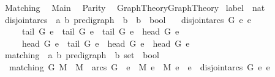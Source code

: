 %
\begin{isabellebody}%
\def\isabellecontext{Matching}%
%
\isadelimtheory
%
\endisadelimtheory
%
\isatagtheory
{}\isamarkupfalse%
\ Matching\isanewline
{}\isanewline
\ \ Main\isanewline
\ \ Parity\isanewline
\ \ {\isachardoublequoteopen}{\isachardot}{\isachardot}{\isacharslash}Graph{\isacharunderscore}Theory{\isacharslash}Graph{\isacharunderscore}Theory{\isachardoublequoteclose}\isanewline
{}%
\endisatagtheory
{\isafoldtheory}%
%
\isadelimtheory
\isanewline
%
\endisadelimtheory
\isanewline
\isanewline
{}\isamarkupfalse%
\ label\ {\isacharequal}\ nat\isanewline
\isanewline
{}\isamarkupfalse%
\ disjoint{\isacharunderscore}arcs\ {\isacharcolon}{\isacharcolon}\ {\isachardoublequoteopen}{\isacharparenleft}{\isacharprime}a{\isacharcomma}\ {\isacharprime}b{\isacharparenright}\ pre{\isacharunderscore}digraph\ {\isacharequal}{\isachargreater}\ {\isacharprime}b\ {\isasymRightarrow}\ {\isacharprime}b\ {\isasymRightarrow}\ bool{\isachardoublequoteclose}\ \isanewline
\ \ {\isachardoublequoteopen}disjoint{\isacharunderscore}arcs\ G\ e{}\ e{}\ {\isacharequal}\ {\isacharparenleft}\isanewline
\ \ \ \ \ tail\ G\ e{}\ {\isasymnoteq}\ tail\ G\ e{}\ {\isasymand}\ tail\ G\ e{}\ {\isasymnoteq}\ head\ G\ e{}\ {\isasymand}\ \isanewline
\ \ \ \ \ head\ G\ e{}\ {\isasymnoteq}\ tail\ G\ e{}\ {\isasymand}\ head\ G\ e{}\ {\isasymnoteq}\ head\ G\ e{}{\isacharparenright}{\isachardoublequoteclose}\isanewline
\isanewline
{}\isamarkupfalse%
\ matching\ {\isacharcolon}{\isacharcolon}\ {\isachardoublequoteopen}{\isacharparenleft}{\isacharprime}a{\isacharcomma}\ {\isacharprime}b{\isacharparenright}\ pre{\isacharunderscore}digraph\ {\isasymRightarrow}\ {\isacharprime}b\ set\ {\isasymRightarrow}\ bool{\isachardoublequoteclose}\ \isanewline
\ \ {\isachardoublequoteopen}matching\ G\ M\ {\isacharequal}\ {\isacharparenleft}M\ {\isasymsubseteq}\ arcs\ G\ {\isasymand}\ {\isacharparenleft}{\isasymforall}e{}\ {\isasymin}\ M{\isachardot}\ {\isasymforall}e{}\ {\isasymin}\ M{\isachardot}\ e{}\ {\isasymnoteq}\ e{}\ {\isasymlongrightarrow}\ disjoint{\isacharunderscore}arcs\ G\ e{}\ e{}{\isacharparenright}{\isacharparenright}{\isachardoublequoteclose}\isanewline
\isanewline
{}\isamarkupfalse%

\end{isabellebody}
